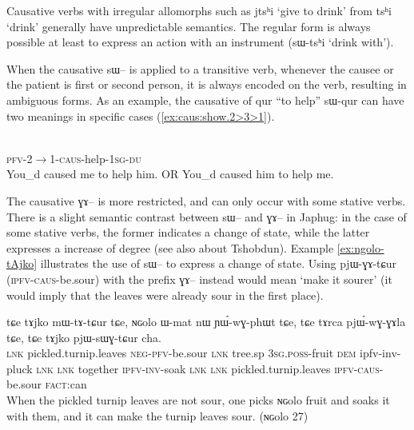 \documentclass[oldfontcommands,oneside,a4paper,11pt]{article}
\newcommand{\ipa}[1]{{\phon #1}} %
\begin{document}
Causative verbs with irregular allomorphs such as \ipa{jtsʰi} `give to drink'  from \ipa{tsʰi} `drink' generally have unpredictable semantics. The regular form is always possible at least to express an action with an instrument (\ipa{sɯ-tsʰi} `drink with').

When the causative \ipa{sɯ--} is applied to a transitive verb, whenever the causee or the patient is first or second person, it is always encoded on the verb, resulting in ambiguous forms. As an example, the causative of \ipa{qur} ``to help''  \ipa{sɯ-qur} can have two meanings in specific cases (\ref{ex:caus:show.2>3>1}).

\begin{exe} 
\ex \label{ex:caus:show.2>3>1}
\gll   \ipa{tɤ-kɯ-sɯ-qur-a-ndʑi}  \\
 \textsc{pfv-2$\rightarrow$1-caus}-help-\textsc{1sg-du}  \\
 \glt  You_d caused me to help him. OR You_d caused him to help me. 
\end{exe} 

The causative \ipa{ɣɤ--} is more restricted, and can only occur with some stative verbs. There is a slight semantic contrast between \ipa{sɯ--} and \ipa{ɣɤ--} in Japhug: in the case of some stative verbs, the former indicates a change of state, while the latter expresses a increase of degree (see also \citealt{jackson06paisheng} about Tshobdun). Example \ref{ex:ngolo-tAjko}  illustrates the use of \ipa{sɯ--} to express a change of state. Using \ipa{pjɯ-ɣɤ-tɕur} (\textsc{ipfv-caus}-be.sour) with the prefix \ipa{ɣɤ--} instead would mean `make it sourer' (it would imply that the leaves were already sour in the first place).

 \begin{exe}
\ex \label{ex:ngolo-tAjko}
\gll
\ipa{tɕe} 	\ipa{tɤjko} 	\ipa{mɯ-tɤ-tɕur} 	\ipa{tɕe,} 	\ipa{ɴɢolo} 	\ipa{ɯ-mat} 	\ipa{nɯ} 	\ipa{ɲɯ́-wɣ-phɯt} 	\ipa{tɕe,} 	\ipa{tɕe} 	\ipa{tɤrca} 	\ipa{pjɯ́-wɣ-ɣɤla} 	\ipa{tɕe,} 	\ipa{tɕe} 	\ipa{tɤjko} 	\ipa{pjɯ-sɯɣ-tɕur} 	\ipa{cha.} \\ 
\textsc{lnk} pickled.turnip.leaves \textsc{neg-pfv}-be.sour \textsc{lnk} tree.sp \textsc{3sg.poss}-fruit \textsc{dem} ipfv-inv-pluck \textsc{lnk} \textsc{lnk} together \textsc{ipfv-inv}-soak \textsc{lnk} \textsc{lnk}  pickled.turnip.leaves \textsc{ipfv-caus}-be.sour \textsc{fact}:can \\
 \glt When the pickled turnip leaves are not sour, one picks \ipa{ɴɢolo} fruit and soaks it with them, and it can make the turnip leaves sour.   (\ipa{ɴɢolo} 27)
   \end{exe}
\end{document}

